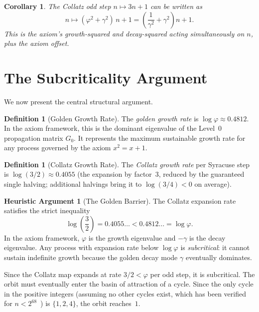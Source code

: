 \documentclass[11pt,a4paper]{article}
\newtheorem{corollary}[theorem]{Corollary}
\theoremstyle{definition}
\newtheorem{definition}[theorem]{Definition}
\newtheorem{heuristic}[theorem]{Heuristic Argument}
\newcommand{\gam}{\gamma}
\begin{document}
\begin{corollary}\label{cor:collatz-as-gamma-map}
The Collatz odd step $n \mapsto 3n + 1$ can be written as
\[
  n \mapsto (\varphi^2 + \gam^2)\,n + 1 = \left(\frac{1}{\gam^2} + \gam^2\right)n + 1.
\]
This is the axiom's growth-squared and decay-squared acting simultaneously on
$n$, plus the axiom offset.
\end{corollary}

\section{The Subcriticality Argument}\label{sec:subcritical}

We now present the central structural argument.

\begin{definition}[Golden Growth Rate]
The \emph{golden growth rate} is $\log\varphi \approx 0.4812$. In the axiom
framework, this is the dominant eigenvalue of the Level~0 propagation matrix
$G_0$. It represents the maximum sustainable growth rate for any process
governed by the axiom $x^2 = x + 1$.
\end{definition}

\begin{definition}[Collatz Growth Rate]
The \emph{Collatz growth rate} per Syracuse step is
$\log(3/2) \approx 0.4055$ (the expansion by factor~3, reduced by the
guaranteed single halving; additional halvings bring it to $\log(3/4) < 0$
on average).
\end{definition}

\begin{heuristic}[The Golden Barrier]\label{heur:barrier}
The Collatz expansion rate satisfies the strict inequality
\begin{equation}\label{eq:barrier}
  \log\!\left(\frac{3}{2}\right) = 0.4055\ldots < 0.4812\ldots = \log\varphi.
\end{equation}
In the axiom framework, $\varphi$ is the growth eigenvalue and $-\gam$ is the
decay eigenvalue. Any process with expansion rate below $\log\varphi$ is
\emph{subcritical}: it cannot sustain indefinite growth because the golden
decay mode $\gam$ eventually dominates.

Since the Collatz map expands at rate $3/2 < \varphi$ per odd step, it is
subcritical. The orbit must eventually enter the basin of attraction of a
cycle. Since the only cycle in the positive integers (assuming no other cycles
exist, which has been verified for $n < 2^{68}$~\cite{verification}) is
$\{1, 2, 4\}$, the orbit reaches~$1$.
\end{heuristic}
\end{document}
